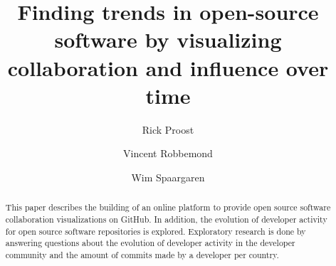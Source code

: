 \documentclass[acmtog, authorversion]{acmart}
\begin{document}
\title{Finding trends in open-source software by visualizing collaboration and influence over time} 

\author{Rick Proost}

\author{Vincent Robbemond}

\author{Wim Spaargaren}

\begin{abstract}
This paper describes the building of an online platform to provide open source software collaboration visualizations on GitHub.
In addition, the evolution of developer activity for open source software repositories is explored.
Exploratory research is done by answering questions about the evolution of developer activity in the developer community and the amount of commits made by a developer per country.
\end{abstract}


\maketitle
\end{document}
